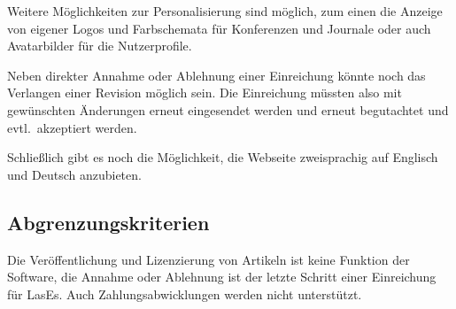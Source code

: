 Weitere Möglichkeiten zur Personalisierung sind möglich,
zum einen die Anzeige von eigener Logos und Farbschemata für Konferenzen und Journale oder auch Avatarbilder für die Nutzerprofile.

Neben direkter Annahme oder Ablehnung einer Einreichung könnte noch das Verlangen einer Revision möglich sein.
Die Einreichung müssten also mit gewünschten Änderungen erneut eingesendet werden und erneut begutachtet und evtl.\ akzeptiert werden.

Schließlich gibt es noch die Möglichkeit, die Webseite zweisprachig auf Englisch und Deutsch anzubieten.

\subsection{Abgrenzungskriterien}

Die Veröffentlichung und Lizenzierung von Artikeln ist keine Funktion der Software,
die Annahme oder Ablehnung ist der letzte Schritt einer Einreichung für LasEs.
Auch Zahlungsabwicklungen werden nicht unterstützt.